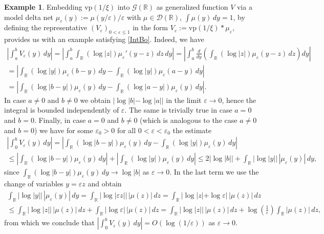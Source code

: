 \documentclass[sumlimits,intlimits,namelimits%
]{amsart}
\newcommand{\D}{\ensuremath{\mathcal{D}}}
\newcommand{\G}{\ensuremath{\mathcal{G}}}
\newcommand{\mb}[1]{\ensuremath{\mathbb{#1}}}
\newcommand{\R}{\mb{R}}
\newcommand{\vp}{\mathrm{vp}}
\newcommand{\diff}[1]{\frac{d}{d#1}}
\theoremstyle{definition}
\newtheorem{example}[theorem]{Example}
\newcommand{\eps}{\varepsilon}
\begin{document}
\begin{example}\label{VasVP}
Embedding $\vp(1/\xi)$ into $\G(\R)$ as generalized function $V$ via a model delta net $\mu_\eps(y) := \mu(y/\eps)/\eps$ with $\mu \in \D(\R)$, $\int \mu(y) \, dy = 1$, by defining the representative $(V_\eps)_{0 < \eps \leq 1}$ in the form $V_\eps := \vp(1/\xi) * \mu_\eps$, provides us with an example satisfying \eqref{IntBo}. Indeed, we have
\begin{multline*}
   \left| \int_a^b V_\eps(y) \, dy \right| = \left| \int_a^b \int_\R (\log |z|) \mu_\eps'(y - z) \, dz \, dy \right|
   =  \left| \int_a^b \diff{y} \left( \int_\R (\log |z|) \mu_\eps(y - z) \, dz \right) dy \right|\\
   = \left| \int_\R (\log |y|) \mu_\eps(b - y) \, dy -  \int_\R (\log |y|) \mu_\eps(a - y) \, dy \right| \\
   =  \left| \int_\R (\log |b - y|) \mu_\eps(y) \, dy -  \int_\R (\log |a - y|) \mu_\eps(y) \, dy \right|.
\end{multline*} 
In case $a \neq 0$ and $b \neq 0$ we obtain $| \log |b| - \log |a| |$ in the limit $\eps \to 0$, hence the integral is bounded independently of $\eps$. The same is trivially true in case $a=0$ and $b = 0$. Finally, in case $a = 0$ and $b \neq 0$ (which is analogous to the case $a \neq 0$ and $b =0$) we have for some $\eps_0 > 0$ for all $0 < \eps < \eps_0$ the estimate
\begin{multline*}
     \left| \int_0^b V_\eps(y) \, dy \right| = 
     \left| \int_\R (\log |b - y|) \mu_\eps(y) \, dy -  \int_\R (\log |y|) \mu_\eps(y) \, dy \right| \\
     \leq  \left| \int_\R (\log |b - y|) \mu_\eps(y) \, dy \right|  + \left| \int_\R (\log |y|) \mu_\eps(y) \, dy \right| 
     \leq 2 | \log |b| | + \int_\R | \log |y| | \, |\mu_\eps(y)| \, dy,
\end{multline*}
since $ \int_\R (\log |b - y|) \mu_\eps(y) \, dy \to \log |b|$ as $\eps \to 0$. In the last term we use the change of variables $y = \eps z$ and obtain
\begin{multline*}
    \int_\R | \log |y| | \, |\mu_\eps(y)| \, dy = \int_\R | \log |\eps z | | \, |\mu(z)| \, dz = 
        \int_\R | \log | z | + \log \eps | \, |\mu(z)| \, dz  \\
        \leq  \int_\R | \log |z | | \, |\mu(z)| \, dz +  \int_\R | \log \eps | \, |\mu(z)| \, dz
        =  \int_\R | \log |z | | \, |\mu(z)| \, dz + \log\left(\frac{1}{\eps}\right)  \int_\R  |\mu(z)| \, dz,
\end{multline*}
from which we conclude that $ \left| \int_0^b V_\eps(y) \, dy \right| = O(\log(1/\eps))$ as $\eps \to 0$.
\end{example}
\end{document}
